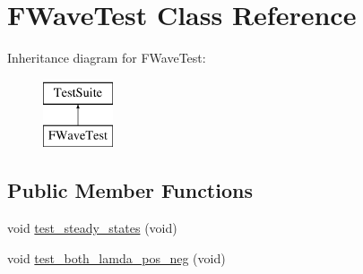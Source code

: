 \hypertarget{classFWaveTest}{\section{F\-Wave\-Test Class Reference}
\label{classFWaveTest}
}
Inheritance diagram for F\-Wave\-Test\-:\begin{figure}[H]
\begin{center}
\leavevmode
\includegraphics[height=2.000000cm]{classFWaveTest}
\end{center}
\end{figure}
\subsection*{Public Member Functions}
\begin{DoxyCompactItemize}
\item 
void \hyperlink{classFWaveTest_aadefc508d0a1d5e07f9c42bcf5ac7315}{test\-\_\-steady\-\_\-states} (void)
\item 
void \hyperlink{classFWaveTest_a1485f6c0377d6b94da24586b9a39e600}{test\-\_\-both\-\_\-lamda\-\_\-pos\-\_\-neg} (void)
\end{DoxyCompactItemize}


